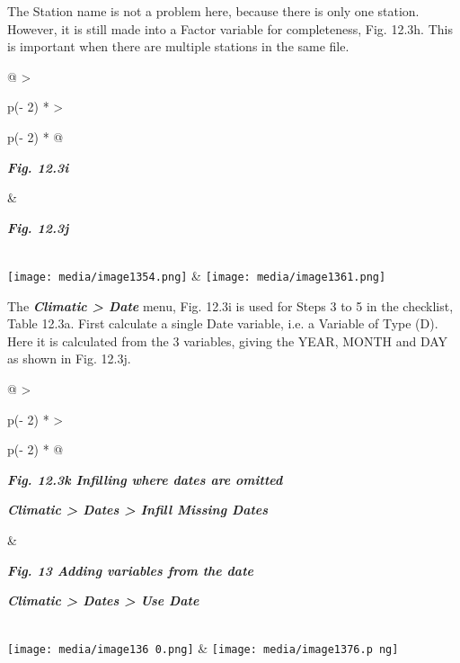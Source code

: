 \documentclass[
  letterpaper,
  DIV=11,
  numbers=noendperiod]{scrreprt}
\begin{document}
The Station name is not a problem here, because there is only one
station. However, it is still made into a Factor variable for
completeness, Fig. 12.3h. This is important when there are multiple
stations in the same file.

\begin{longtable}[]{@{}
  >{\raggedright\arraybackslash}p{(\columnwidth - 2\tabcolsep) * }
  >{\raggedright\arraybackslash}p{(\columnwidth - 2\tabcolsep) * }@{}}
\toprule\noalign{}
\begin{minipage}[b]{\linewidth}\raggedright
\textbf{\emph{Fig. 12.3i}}
\end{minipage} & \begin{minipage}[b]{\linewidth}\raggedright
\textbf{\emph{Fig. 12.3j}}
\end{minipage} \\
\midrule\noalign{}
\endhead
\bottomrule\noalign{}
\endlastfoot
\texttt{[image: media/image1354.png]}
&
\texttt{[image: media/image1361.png]} \\
\end{longtable}

The \textbf{\emph{Climatic \textgreater{} Date}} menu, Fig. 12.3i is
used for Steps 3 to 5 in the checklist, Table 12.3a. First calculate a
single Date variable, i.e. a Variable of Type (D). Here it is calculated
from the 3 variables, giving the YEAR, MONTH and DAY as shown in Fig.
12.3j.

\begin{longtable}[]{@{}
  >{\raggedright\arraybackslash}p{(\columnwidth - 2\tabcolsep) * }
  >{\raggedright\arraybackslash}p{(\columnwidth - 2\tabcolsep) * }@{}}
\toprule\noalign{}
\begin{minipage}[b]{\linewidth}\raggedright
\textbf{\emph{Fig. 12.3k Infilling where dates are omitted}}

\textbf{\emph{Climatic \textgreater{} Dates \textgreater{} Infill
Missing Dates}}
\end{minipage} & \begin{minipage}[b]{\linewidth}\raggedright
\textbf{\emph{Fig. 13 Adding variables from the date}}

\textbf{\emph{Climatic \textgreater{} Dates \textgreater{} Use Date}}
\end{minipage} \\
\midrule\noalign{}
\endhead
\bottomrule\noalign{}
\endlastfoot
\texttt{[image: media/image136 0.png]}
&
\texttt{[image: media/image1376.p ng]} \\
\end{longtable}
\end{document}
